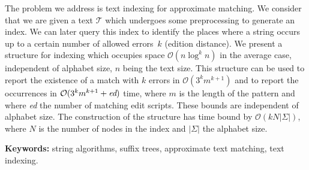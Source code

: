 The problem we address is text indexing for approximate matching. We consider that we are given a text $\mathcal{T}$ which undergoes some preprocessing to generate an index. We can later query this index to identify the places where a string occurs up to a certain number of allowed errors~$k$ (edition distance). We present a structure for indexing which occupies space $\mathcal{O}(n\log^kn)$ in the average case, independent of alphabet size, $n$ being the text size. This structure can be used to report the existence of a match with $k$ errors in $\mathcal{O}(3^k m^{k+1})$ and to report the occurrences in $\mathcal{O}(3^k m^{k+1} + \mbox{\it ed})$ time, where $m$ is the length of the pattern and where {\it ed} the number of matching edit scripts. These bounds are independent of alphabet size. The construction of the structure has time bound by $\mathcal{O}(kN|\Sigma|)$, where $N$ is the number of nodes in the index and $|\Sigma|$ the alphabet size. 

\textbf{Keywords:} string algorithms, suffix trees, approximate text matching, text indexing.
